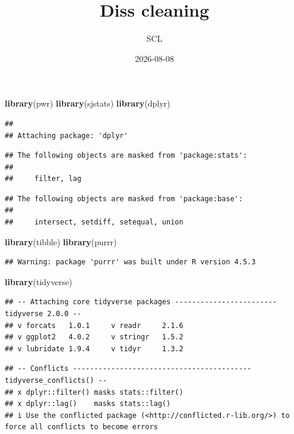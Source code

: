 \documentclass[
]{article}
\title{Diss cleaning}
\author{SCL}
\date{2026-08-08}
\newenvironment{Shaded}{\begin{snugshade}}{\end{snugshade}}
\newcommand{\FunctionTok}[1]{\textcolor[rgb]{0.13,0.29,0.53}{\textbf{#1}}}
\newcommand{\NormalTok}[1]{#1}
\begin{document}
\maketitle

\begin{Shaded}
\begin{Highlighting}[]
\FunctionTok{library}\NormalTok{(pwr)      }
\FunctionTok{library}\NormalTok{(sjstats)  }
\FunctionTok{library}\NormalTok{(dplyr)}
\end{Highlighting}
\end{Shaded}

\begin{verbatim}
## 
## Attaching package: 'dplyr'
\end{verbatim}

\begin{verbatim}
## The following objects are masked from 'package:stats':
## 
##     filter, lag
\end{verbatim}

\begin{verbatim}
## The following objects are masked from 'package:base':
## 
##     intersect, setdiff, setequal, union
\end{verbatim}

\begin{Shaded}
\begin{Highlighting}[]
\FunctionTok{library}\NormalTok{(tibble)}
\FunctionTok{library}\NormalTok{(purrr)}
\end{Highlighting}
\end{Shaded}

\begin{verbatim}
## Warning: package 'purrr' was built under R version 4.5.3
\end{verbatim}

\begin{Shaded}
\begin{Highlighting}[]
\FunctionTok{library}\NormalTok{(tidyverse)}
\end{Highlighting}
\end{Shaded}

\begin{verbatim}
## -- Attaching core tidyverse packages ------------------------ tidyverse 2.0.0 --
## v forcats   1.0.1     v readr     2.1.6
## v ggplot2   4.0.2     v stringr   1.5.2
## v lubridate 1.9.4     v tidyr     1.3.2
\end{verbatim}

\begin{verbatim}
## -- Conflicts ------------------------------------------ tidyverse_conflicts() --
## x dplyr::filter() masks stats::filter()
## x dplyr::lag()    masks stats::lag()
## i Use the conflicted package (<http://conflicted.r-lib.org/>) to force all conflicts to become errors
\end{verbatim}
\end{document}
